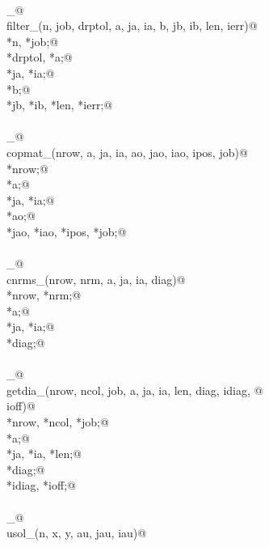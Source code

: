 \documentclass[12pt]{article}
\begin{document}
\begin{flushleft}
\begin{minipage}{\linewidth}
\begin{list}{}{}
\mbox{}\verb@@\\
\mbox{}\verb@filter_@\\
\mbox{}\verb@int filter_(n, job, drptol, a, ja, ia, b, jb, ib, len, ierr)@\\
\mbox{}\verb@integer *n, *job;@\\
\mbox{}\verb@doublereal *drptol, *a;@\\
\mbox{}\verb@integer *ja, *ia;@\\
\mbox{}\verb@doublereal *b;@\\
\mbox{}\verb@integer *jb, *ib, *len, *ierr;@\\
\mbox{}\verb@@\\
\mbox{}\verb@copmat_@\\
\mbox{}\verb@int copmat_(nrow, a, ja, ia, ao, jao, iao, ipos, job)@\\
\mbox{}\verb@integer *nrow;@\\
\mbox{}\verb@doublereal *a;@\\
\mbox{}\verb@integer *ja, *ia;@\\
\mbox{}\verb@doublereal *ao;@\\
\mbox{}\verb@integer *jao, *iao, *ipos, *job;@\\
\mbox{}\verb@@\\
\mbox{}\verb@cnrms_@\\
\mbox{}\verb@int cnrms_(nrow, nrm, a, ja, ia, diag)@\\
\mbox{}\verb@integer *nrow, *nrm;@\\
\mbox{}\verb@doublereal *a;@\\
\mbox{}\verb@integer *ja, *ia;@\\
\mbox{}\verb@doublereal *diag;@\\
\mbox{}\verb@@\\
\mbox{}\verb@getdia_@\\
\mbox{}\verb@int getdia_(nrow, ncol, job, a, ja, ia, len, diag, idiag, @\\
\mbox{}\verb@        ioff)@\\
\mbox{}\verb@integer *nrow, *ncol, *job;@\\
\mbox{}\verb@doublereal *a;@\\
\mbox{}\verb@integer *ja, *ia, *len;@\\
\mbox{}\verb@doublereal *diag;@\\
\mbox{}\verb@integer *idiag, *ioff;@\\
\mbox{}\verb@@\\
\mbox{}\verb@usol_@\\
\mbox{}\verb@int usol_(n, x, y, au, jau, iau)@\\

\end{list}
\end{minipage}
\end{flushleft}
\end{document}
